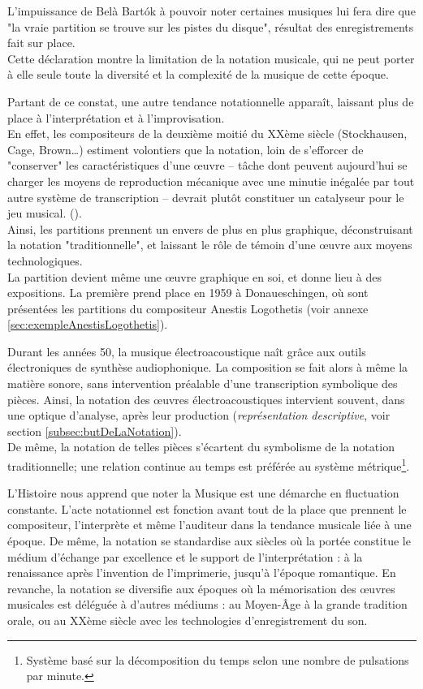 L'impuissance de Belà Bart\'{o}k à pouvoir noter certaines musiques lui fera dire que "la vraie partition se trouve sur les pistes du disque", résultat des enregistrements fait sur place.\\
Cette déclaration montre la limitation de la notation musicale, qui ne peut porter à elle seule toute la diversité et la complexité de la musique de cette époque.

Partant de ce constat, une autre tendance notationnelle apparaît, laissant plus de place à l'interprétation et à l'improvisation. \\
En effet, les compositeurs de la deuxième moitié du XXème siècle (Stockhausen, Cage, Brown…) \og estiment volontiers que la notation, loin de s'efforcer de "conserver" les caractéristiques d'une œuvre -- tâche dont peuvent aujourd'hui se charger les moyens de reproduction mécanique avec une minutie inégalée par tout autre système de transcription -- devrait plutôt constituer un catalyseur pour le jeu musical. \fg (\cite[115]{bosseur2005}).\\
Ainsi, les partitions prennent un envers de plus en plus graphique, déconstruisant la notation "traditionnelle", et laissant le rôle de témoin d'une œuvre aux moyens technologiques.\\
La partition devient même une œuvre graphique en soi, et donne lieu à des expositions. La première prend place en 1959 à Donaueschingen, où sont présentées les partitions du compositeur Anestis Logothetis (voir annexe \ref{sec:exempleAnestisLogothetis}).

Durant les années 50, la musique électroacoustique naît grâce aux outils électroniques de synthèse audio\-phonique. 
La composition se fait alors à même la matière sonore, sans intervention préalable d'une transcription symbolique des pièces.
Ainsi, la notation des œuvres électroacoustiques intervient souvent, dans une optique d'analyse, après leur production (\textit{représentation descriptive}, voir section \ref{subsec:butDeLaNotation}).\\
De même, la notation de telles pièces s'écartent du symbolisme de la notation traditionnelle; une relation continue au temps est préférée au système métrique\footnote{Système basé sur la décomposition du temps selon une nombre de pulsations par minute.}.

\bigskip

L'Histoire nous apprend que noter la Musique est une démarche en fluctuation constante. L'acte notationnel est fonction avant tout de la place que prennent le compositeur, l'interprète et même l'auditeur dans la tendance musicale liée à une époque.
De même, la notation se standardise aux siècles où la portée constitue le médium d'échange par excellence et le support de l'interprétation : à la renaissance après l'invention de l'imprimerie, jusqu'à l'époque romantique.
En revanche, la notation se diversifie aux époques où la mémorisation des œuvres musicales est déléguée à d'autres médiums : au Moyen-Âge à la grande tradition orale, ou au XXème siècle avec les technologies d'enregistrement du son.   

